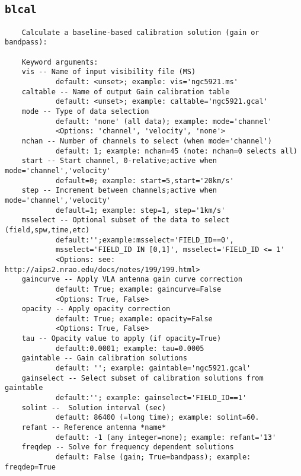 \subsection{{\tt blcal}}
\label{section:tasks.blcal}

\small
\begin{verbatim}
    Calculate a baseline-based calibration solution (gain or bandpass):
    
    Keyword arguments:
    vis -- Name of input visibility file (MS)
            default: <unset>; example: vis='ngc5921.ms'
    caltable -- Name of output Gain calibration table
            default: <unset>; example: caltable='ngc5921.gcal'
    mode -- Type of data selection
            default: 'none' (all data); example: mode='channel'
            <Options: 'channel', 'velocity', 'none'>
    nchan -- Number of channels to select (when mode='channel')
            default: 1; example: nchan=45 (note: nchan=0 selects all)
    start -- Start channel, 0-relative;active when mode='channel','velocity'
            default=0; example: start=5,start='20km/s'
    step -- Increment between channels;active when mode='channel','velocity'
            default=1; example: step=1, step='1km/s'
    msselect -- Optional subset of the data to select (field,spw,time,etc)
            default:'';example:msselect='FIELD_ID==0', 
            msselect='FIELD_ID IN [0,1]', msselect='FIELD_ID <= 1'
            <Options: see: http://aips2.nrao.edu/docs/notes/199/199.html>
    gaincurve -- Apply VLA antenna gain curve correction
            default: True; example: gaincurve=False
            <Options: True, False>
    opacity -- Apply opacity correction
            default: True; example: opacity=False
            <Options: True, False>
    tau -- Opacity value to apply (if opacity=True)
            default:0.0001; example: tau=0.0005
    gaintable -- Gain calibration solutions
            default: ''; example: gaintable='ngc5921.gcal'
    gainselect -- Select subset of calibration solutions from gaintable
            default:''; example: gainselect='FIELD_ID==1'
    solint --  Solution interval (sec)
            default: 86400 (=long time); example: solint=60.
    refant -- Reference antenna *name*
            default: -1 (any integer=none); example: refant='13'
    freqdep -- Solve for frequency dependent solutions
            default: False (gain; True=bandpass); example: freqdep=True
\end{verbatim}
\normalsize


